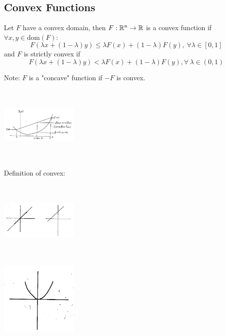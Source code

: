 \subsection{Convex Functions}
Let $F$ have a convex domain, then $F:\mathbb{R}^n\rightarrow \mathbb{R}$ is a convex function if $\forall x,y \in \text{dom} (F)$:
\begin{equation*}
F(\lambda x + (1-\lambda)y) \leq \lambda F(x) + (1-\lambda)F(y),\ \forall \lambda \in [0,1]
\end{equation*}
and $F$ is strictly convex if 
\begin{equation*}
F(\lambda x + (1-\lambda)y) < \lambda F(x) + (1-\lambda)F(y), \forall\ \lambda \in (0,1)
\end{equation*}

Note: $F$ is a "concave" function if $-F$ is convex.

\begin{marginfigure}
	\centering
	\includegraphics[width=1.5in,height=1.5in]{figures/ch08/figure1030_6.png}
\end{marginfigure}

Definition of convex:
	
\begin{marginfigure}
	\centering
	\includegraphics[width=1.5in,height=1.5in]{figures/ch08/figure1030_7.png}
\end{marginfigure}

\begin{marginfigure}
	\centering
	\includegraphics[width=1.5in,height=1.5in]{figures/ch08/figure1030_8.png}
\end{marginfigure}

